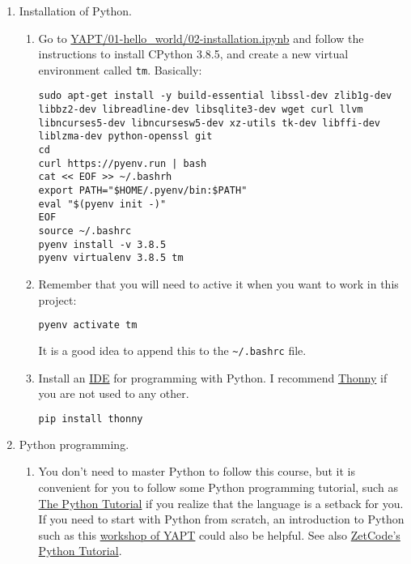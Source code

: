 \begin{enumerate}
  
\item Installation of Python.
  
  \begin{enumerate}
    
  \item Go to
    \href{https://github.com/vicente-gonzalez-ruiz/YAPT/blob/master/01-hello_world/02-installation.ipynb}{YAPT/01-hello\_world/02-installation.ipynb}
    \cite{YAPT} and follow the instructions to install CPython 3.8.5,
    and create a new virtual environment called \texttt{tm}. Basically:

\begin{verbatim}
sudo apt-get install -y build-essential libssl-dev zlib1g-dev libbz2-dev libreadline-dev libsqlite3-dev wget curl llvm libncurses5-dev libncursesw5-dev xz-utils tk-dev libffi-dev liblzma-dev python-openssl git
cd
curl https://pyenv.run | bash
cat << EOF >> ~/.bashrh
export PATH="$HOME/.pyenv/bin:$PATH"
eval "$(pyenv init -)"
EOF
source ~/.bashrc
pyenv install -v 3.8.5
pyenv virtualenv 3.8.5 tm
\end{verbatim}

  \item Remember that you will need to active it when you want to
    work in this project:

    \begin{lstlisting}[language=Bash]
      pyenv activate tm
    \end{lstlisting}

    It is a good idea to append this to the \verb|~/.bashrc| file.
    
  \item Install an
    \href{https://en.wikipedia.org/wiki/Integrated_development_environment}{IDE}
    for programming with Python. I recommend
    \href{https://thonny.org/}{Thonny} if you are not used to any
    other.
    
    \begin{lstlisting}[language=Bash]
      pip install thonny
    \end{lstlisting}

  \end{enumerate}
  
\item Python programming.
  
  \begin{enumerate}
    
  \item You don't need to master Python to follow this course, but it
    is convenient for you to follow some Python programming tutorial,
    such as \href{https://docs.python.org/3/tutorial/}{The Python
    Tutorial} \cite{python-tutorial} if you realize that the language
    is a setback for you. If you need to start with Python from
    scratch, an introduction to Python such as
    this \href{https://github.com/vicente-gonzalez-ruiz/YAPT/tree/master/workshops/programacion_python_ESO}{workshop
    of YAPT} \cite{YAPT} could also be helpful. See
    also \href{http://zetcode.com/lang/python/}{ZetCode's Python
    Tutorial}.
    

\end{enumerate}
\end{enumerate}
